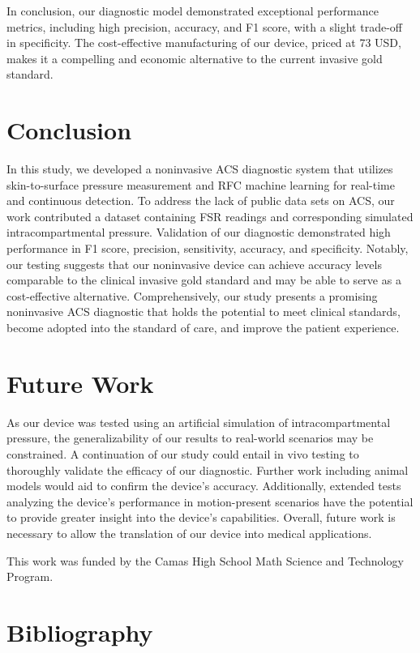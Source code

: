 \documentclass[times, twoside]{zHenriquesLab-StyleBioRxiv}
\begin{document}
In conclusion, our diagnostic model demonstrated exceptional performance metrics, including high precision, accuracy, and F1 score, with a slight trade-off in specificity. The cost-effective manufacturing of our device, priced at 73 USD, makes it a compelling and economic alternative to the current invasive gold standard.

\section*{Conclusion}
In this study, we developed a noninvasive ACS diagnostic system that utilizes skin-to-surface pressure measurement and RFC machine learning for real-time and continuous detection. To address the lack of public data sets on ACS, our work contributed a dataset containing FSR readings and corresponding simulated intracompartmental pressure. Validation of our diagnostic demonstrated high performance in F1 score, precision, sensitivity, accuracy, and specificity. Notably, our testing suggests that our noninvasive device can achieve accuracy levels comparable to the clinical invasive gold standard and may be able to serve as a cost-effective alternative. Comprehensively, our study presents a promising noninvasive ACS diagnostic that holds the potential to meet clinical standards, become adopted into the standard of care, and improve the patient experience. 

\section*{Future Work}
As our device was tested using an artificial simulation of intracompartmental pressure, the generalizability of our results to real-world scenarios may be constrained. A continuation of our study could entail in vivo testing to thoroughly validate the efficacy of our diagnostic. Further work including animal models would aid to confirm the device’s accuracy. Additionally, extended tests analyzing the device’s performance in motion-present scenarios have the potential to provide greater insight into the device’s capabilities. Overall, future work is necessary to allow the translation of our device into medical applications. 

\begin{acknowledgements}
This work was funded by the Camas High School Math Science and Technology Program.
\end{acknowledgements}

\section*{Bibliography}
\nocite{*} 


\onecolumn
\end{document}
